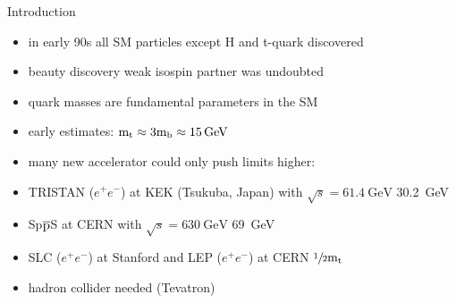 \begin{frame}{Introduction}

	\begin{minipage}[c][.23\textheight]{.8\textwidth}
		\begin{itemize}
			\itemfill
			\item in early 90s all SM particles except H and t-quark discovered
			\item beauty discovery \ra weak isospin partner was undoubted
			\item quark masses are fundamental parameters in the SM
		\end{itemize}
	\end{minipage}
	\begin{minipage}{.18\textwidth}
	\end{minipage}
	
	\begin{itemize}\itemfill
		\item early estimates: $\text{m}_{\text{t}} \approx 3 \text{m}_{\text{b}} \approx \SI{15}{\giga\electronvolt}$
		\item many new accelerator could only push limits higher:
		\item TRISTAN ($e^+e^-$) at KEK (Tsukuba, Japan) with $\sqrt{s} = \SI{61.4}{\giga\electronvolt}$ \ra \SI{30.2}{\giga\electronvolt}
		\item Sp$\overline{\text{p}}$S at CERN with $\sqrt{s} = \SI{630}{\giga\electronvolt}$ \ra \SI{69}{\giga\electronvolt}
		\item SLC ($e^+e^-$) at Stanford and LEP ($e^+e^-$) at CERN \ra $\sfrac{1}{2} \text{m}_{\text{t}}$
		\item hadron collider needed (\ra Tevatron)
	\end{itemize}
	
\end{frame}
